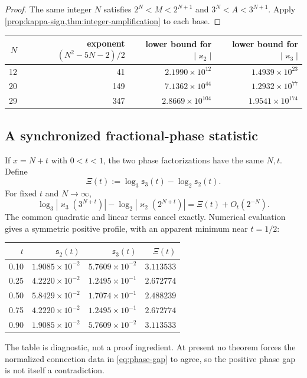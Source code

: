 \documentclass[11pt]{article}
\theoremstyle{definition}
\newcommand{\kk}{\varkappa}
\begin{document}
\begin{proof}
The same integer $N$ satisfies $2^N<M<2^{N+1}$ and $3^N<A<3^{N+1}$.  Apply \cref{prop:kappa-sign,thm:integer-amplification} to each base.
\end{proof}

\begin{center}
\begin{tabular}{@{}rrrr@{}}
\toprule
$N$ & exponent $(N^2-5N-2)/2$ & lower bound for $|\kk_2|$ & lower bound for $|\kk_3|$ \\
\midrule
12 & 41   & $2.1990\times10^{12}$ & $1.4939\times10^{23}$ \\
20 & 149   & $7.1362\times10^{44}$ & $1.2932\times10^{77}$ \\
29 & 347   & $2.8669\times10^{104}$ & $1.9541\times10^{174}$ \\
\bottomrule
\end{tabular}
\end{center}

\subsection{A synchronized fractional-phase statistic}

If $x=N+t$ with $0<t<1$, the two phase factorizations have the same $N,t$.  Define
\begin{equation}\label{eq:phase-invariant}
 \Xi(t):=
 \log_3\mathfrak{s}_3(t)
 -\log_2\mathfrak{s}_2(t).
\end{equation}
For fixed $t$ and $N\to\infty$,
\begin{equation}\label{eq:phase-gap}
 \log_3|\kk_3(3^{N+t})|
 -\log_2|\kk_2(2^{N+t})|
 =\Xi(t)+O_t(2^{-N}).
\end{equation}
The common quadratic and linear terms cancel exactly.  Numerical evaluation gives a symmetric positive profile, with an apparent minimum near $t=1/2$:
\begin{center}
\begin{tabular}{@{}rrrr@{}}
\toprule
$t$ & $\mathfrak{s}_2(t)$ & $\mathfrak{s}_3(t)$ & $\Xi(t)$ \\
\midrule
0.10 & $1.9085\times10^{-2}$ & $5.7609\times10^{-2}$ & $3.113533$ \\
0.25 & $4.2220\times10^{-2}$ & $1.2495\times10^{-1}$ & $2.672774$ \\
0.50 & $5.8429\times10^{-2}$ & $1.7074\times10^{-1}$ & $2.488239$ \\
0.75 & $4.2220\times10^{-2}$ & $1.2495\times10^{-1}$ & $2.672774$ \\
0.90 & $1.9085\times10^{-2}$ & $5.7609\times10^{-2}$ & $3.113533$ \\
\bottomrule
\end{tabular}
\end{center}
The table is diagnostic, not a proof ingredient.  At present no theorem forces the normalized connection data in \eqref{eq:phase-gap} to agree, so the positive phase gap is not itself a contradiction.
\end{document}

